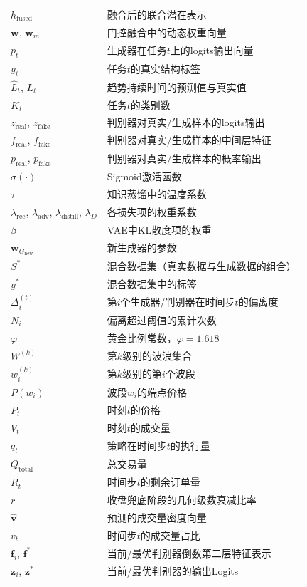 \begin{longtable}{>{\raggedright\arraybackslash}p{4cm} p{10cm}}
$h_{\text{fused}}$ & 融合后的联合潜在表示 \\
$\mathbf{w}$, $\mathbf{w}_m$ & 门控融合中的动态权重向量 \\
$p_t$ & 生成器在任务$t$上的logits输出向量 \\
$y_t$ & 任务$t$的真实结构标签 \\
$\hat{L}_t$, $L_t$ & 趋势持续时间的预测值与真实值 \\
$K_t$ & 任务$t$的类别数 \\
$z_{\text{real}}$, $z_{\text{fake}}$ & 判别器对真实/生成样本的logits输出 \\
$f_{\text{real}}$, $f_{\text{fake}}$ & 判别器对真实/生成样本的中间层特征 \\
$p_{\text{real}}$, $p_{\text{fake}}$ & 判别器对真实/生成样本的概率输出 \\
$\sigma(\cdot)$ & Sigmoid激活函数 \\
$\tau$ & 知识蒸馏中的温度系数 \\
$\lambda_{\text{rec}}$, $\lambda_{\text{adv}}$, $\lambda_{\text{distill}}$, $\lambda_D$ & 各损失项的权重系数 \\
$\beta$ & VAE中KL散度项的权重 \\
$\boldsymbol{w}_{G_{\text{new}}}$ & 新生成器的参数 \\
$S^*$ & 混合数据集（真实数据与生成数据的组合） \\
$y^*$ & 混合数据集中的标签 \\
$\Delta_i^{(t)}$ & 第$i$个生成器/判别器在时间步$t$的偏离度 \\
$N_i$ & 偏离超过阈值的累计次数 \\
$\varphi$ & 黄金比例常数，$\varphi = 1.618$ \\
$W^{(k)}$ & 第$k$级别的波浪集合 \\
$w_i^{(k)}$ & 第$k$级别的第$i$个波段 \\
$P(w_i)$ & 波段$w_i$的端点价格 \\
$P_t$ & 时刻$t$的价格 \\
$V_t$ & 时刻$t$的成交量 \\
$q_t$ & 策略在时间步$t$的执行量 \\
$Q_{\text{total}}$ & 总交易量 \\
$R_t$ & 时间步$t$的剩余订单量 \\
$r$ & 收盘兜底阶段的几何级数衰减比率 \\
$\hat{\mathbf{v}}$ & 预测的成交量密度向量 \\
$v_t$ & 时间步$t$的成交量占比 \\
$\mathbf{f}_i$, $\mathbf{f}^*$ & 当前/最优判别器倒数第二层特征表示 \\
$\mathbf{z}_i$, $\mathbf{z}^*$ & 当前/最优判别器的输出Logits \\
\end{longtable}

